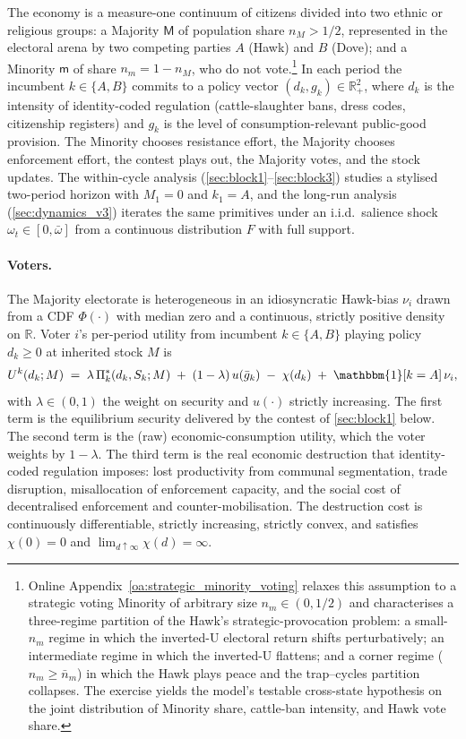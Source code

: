 \documentclass[11pt,twoside]{extarticle}
\begin{document}
The economy is a measure-one continuum of citizens divided into two ethnic or religious groups: a Majority $\mathsf M$ of population share $n_M>1/2$, represented in the electoral arena by two competing parties $A$ (Hawk) and $B$ (Dove); and a Minority $\mathsf m$ of share $n_m=1-n_M$, who do not vote.\footnote{Online Appendix~\ref{oa:strategic_minority_voting} relaxes this assumption to a strategic voting Minority of arbitrary size $n_m\in(0,1/2)$ and characterises a three-regime partition of the Hawk's strategic-provocation problem: a small-$n_m$ regime in which the inverted-U electoral return shifts perturbatively; an intermediate regime in which the inverted-U flattens; and a corner regime ($n_m\ge\bar n_m$) in which the Hawk plays peace and the trap--cycles partition collapses. The exercise yields the model's testable cross-state hypothesis on the joint distribution of Minority share, cattle-ban intensity, and Hawk vote share.} In each period the incumbent $k\in\{A,B\}$ commits to a policy vector $(d_k,g_k)\in\mathbb R_+^2$, where $d_k$ is the intensity of identity-coded regulation (cattle-slaughter bans, dress codes, citizenship registers) and $g_k$ is the level of consumption-relevant public-good provision. The Minority chooses resistance effort, the Majority chooses enforcement effort, the contest plays out, the Majority votes, and the stock updates. The within-cycle analysis (\autoref{sec:block1}--\autoref{sec:block3}) studies a stylised two-period horizon with $M_1=0$ and $k_1=A$, and the long-run analysis (\autoref{sec:dynamics_v3}) iterates the same primitives under an i.i.d.\ salience shock $\omega_t\in[0,\bar\omega]$ from a continuous distribution $F$ with full support.

\paragraph{Voters.} The Majority electorate is heterogeneous in an idiosyncratic Hawk-bias $\nu_i$ drawn from a CDF $\Phi(\cdot)$ with median zero and a continuous, strictly positive density on $\mathbb R$. Voter $i$'s per-period utility from incumbent $k\in\{A,B\}$ playing policy $d_k\ge 0$ at inherited stock $M$ is
\begin{equation}\label{eq:utility_v3}
    U^k(d_k;M)\;=\;\lambda\,\Pi_k^*(d_k,S_k;M)\;+\;(1-\lambda)\,u(\bar g_k)\;-\;\chi(d_k)\;+\;\mathbbm{1}[k=A]\,\nu_i,
\end{equation}
with $\lambda\in(0,1)$ the weight on security and $u(\cdot)$ strictly increasing. The first term is the equilibrium security delivered by the contest of \autoref{sec:block1} below. The second term is the (raw) economic-consumption utility, which the voter weights by $1-\lambda$. The third term is the real economic destruction that identity-coded regulation imposes: lost productivity from communal segmentation, trade disruption, misallocation of enforcement capacity, and the social cost of decentralised enforcement and counter-mobilisation. The destruction cost is continuously differentiable, strictly increasing, strictly convex, and satisfies $\chi(0)=0$ and $\lim_{d\uparrow\infty}\chi(d)=\infty$.
\end{document}
